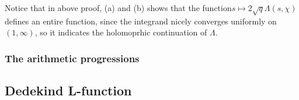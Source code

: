 \begin{remark}
    Notice that in above proof, (a) and (b) shows that the function\(s \mapsto 2\sqrt{q}\Lambda(s,\chi)\) defines an entire function, since the integrand nicely converges uniformly on \((1,\infty)\), so it indicates the holomoprhic continuation of \(\Lambda\).
\end{remark}

\subsubsection{The arithmetic progressions}

\subsection{Dedekind L-function}


    
